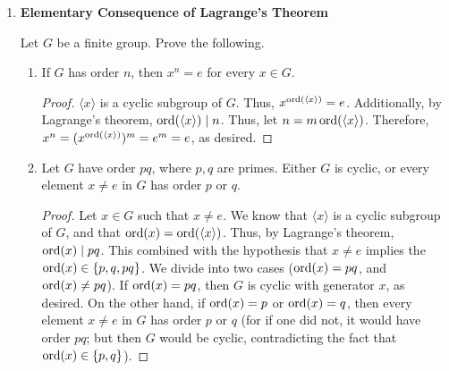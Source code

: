 \documentclass[../notes.tex]{subfiles}
\begin{document}
\begin{enumerate}[label={\textbf{\Alph*.}}]
\begin{enumerate}
        \item The subgroup $H=\langle 3\rangle$ of $\Z$.
        \begin{proof}[Answer]
            If $x\in\langle 3\rangle$, then $H+x=\langle 3\rangle$.\par
            If $x\in\{1+n\mid n\in\langle 3\rangle\}$, then $H+x=\{1+n\mid n\in\langle 3\rangle\}$.\par
            If $x\in\{2+n\mid n\in\langle 3\rangle\}$, then $H+x=\{2+n\mid n\in\langle 3\rangle\}$.
        \end{proof}
        \item The subgroup $H=\Z$ of $\R$.
        \begin{proof}[Answer]
            If $x\in\R$, let $\tilde{x}$ be the greatest integer less than or equal to $x$. Let $x\in\R$ Then $H+x=\{p\in\R\mid p-\tilde{p}=x-\tilde{x}\}$.
        \end{proof}
        \item The subgroup $H=\langle 2^n:n\in\Z\rangle$ of $\R^*$.
        \begin{proof}[Answer]
            The coset of any element in $H$ is $H$. Otherwise, its a scaled version of $H$.
        \end{proof}
    \end{enumerate}
    \item \textbf{Elementary Consequence of Lagrange's Theorem}\par
    Let $G$ be a finite group. Prove the following.
    \begin{enumerate}
        \item If $G$ has order $n$, then $x^n=e$ for every $x\in G$.
        \begin{proof}
            $\langle x\rangle$ is a cyclic subgroup of $G$. Thus, $x^{\operatorname{ord}(\langle x\rangle)}=e$. Additionally, by Lagrange's theorem, $\operatorname{ord}(\langle x\rangle)\mid n$. Thus, let $n=m\operatorname{ord}(\langle x\rangle)$. Therefore, $x^n=(x^{\operatorname{ord}(\langle x\rangle)})^m=e^m=e$, as desired.
        \end{proof}
        \item Let $G$ have order $pq$, where $p,q$ are primes. Either $G$ is cyclic, or every element $x\neq e$ in $G$ has order $p$ or $q$.
        \begin{proof}
            Let $x\in G$ such that $x\neq e$. We know that $\langle x\rangle$ is a cyclic subgroup of $G$, and that $\operatorname{ord}(x)=\operatorname{ord}(\langle x\rangle)$. Thus, by Lagrange's theorem, $\operatorname{ord}(x)\mid pq$. This combined with the hypothesis that $x\neq e$ implies the $\operatorname{ord}(x)\in\{p,q,pq\}$. We divide into two cases ($\operatorname{ord}(x)=pq$, and $\operatorname{ord}(x)\neq pq$). If $\operatorname{ord}(x)=pq$, then $G$ is cyclic with generator $x$, as desired. On the other hand, if $\operatorname{ord}(x)=p$ or $\operatorname{ord}(x)=q$, then every element $x\neq e$ in $G$ has order $p$ or $q$ (for if one did not, it would have order $pq$; but then $G$ would be cyclic, contradicting the fact that $\operatorname{ord}(x)\in\{p,q\}$).

\end{proof}
\end{enumerate}
\end{enumerate}
\end{document}
